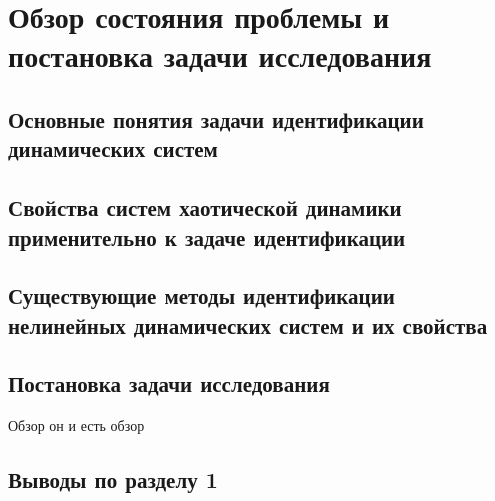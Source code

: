 \chapter{Обзор состояния проблемы и постановка задачи исследования}

\section{Основные понятия задачи идентификации динамических систем}

\section{Свойства систем хаотической динамики применительно к задаче идентификации}

\section{Существующие методы идентификации нелинейных динамических систем и их свойства}


\section{Постановка задачи исследования}

Обзор он и есть обзор

\section{Выводы по разделу 1}

